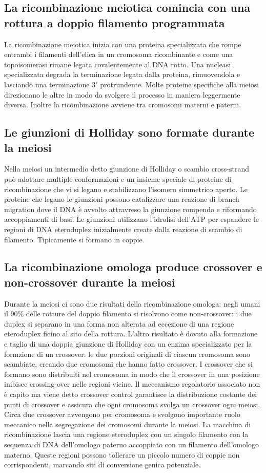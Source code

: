 \subsection{La ricombinazione meiotica comincia con una rottura a doppio filamento programmata}
La ricombinazione meiotica inizia con una proteina specializzata che rompe entrambi i filamenti dell'elica in un cromosoma ricombinante e come una topoisomerasi rimane legata 
covalentemente al DNA rotto. Una nucleasi specializzata degrada la terminazione legata dalla proteina, rimuovendola e lasciando una terminazione $3'$ protrundente. Molte proteine 
specifiche alla meiosi direzionano le altre in modo da svolgere il processo in maniera leggermente diversa. Inoltre la ricombinazione avviene tra cromosomi materni e paterni.
\subsection{Le giunzioni di Holliday sono formate durante la meiosi}
Nella meiosi un intermedio detto giunzione di Holliday o scambio cross-strand pu\`o adottare multiple conformazioni e un insieme speciale di proteine di ricombinazione che vi si legano
e stabilizzano l'isomero simmetrico aperto. Le proteine che legano le giunzioni possono catalizzare una reazione di branch migration dove il DNA \`e avvolto attravreso la giunzione 
rompendo e riformando accoppiamenti di basi. Le giunzioni utilizzano l'idrolisi dell'ATP per espandere le regioni di DNA eteroduplex inizialmente create dalla reazione di scambio di 
filamento. Tipicamente si formano in coppie.
\subsection{La ricombinazione omologa produce crossover e non-crossover durante la meiosi}
Durante la meiosi ci sono due risultati della ricombinazione omologa: negli umani il $90\%$ delle rotture del doppio filamento si risolvono come non-crossover: i due duplex si separano
in una forma non alterata ad eccezione di una regione eteroduplex ficino al sito della rottura. L'altro risultato \`e dovuto alla formazione e taglio di una doppia giunzione di Holliday 
con un enzima specializzato per la formzione di un crossover: le due porzioni originali di ciascun cromosoma sono scambiate, creando due cromosomi che hanno fatto crossover. I 
crossover che si formano sono distribuiti nel cromosoma in modo che il crossover in una posizione inibisce crossing-over nelle regioni vicine. Il meccanismo regolatorio associato non
\`e capito ma viene detto crossover control garantisce la distribuzione costante dei punti di crossover e assicura che ogni cromosoma svolga un crossover ogni meiosi. Circa due 
crossover avvengono per cromosoma e svolgono importante ruolo meccanico nella segregazione dei cromosomi durante la meiosi. La macchina di ricombinazione lascia una regione eteroduplex
con un singolo filamento con la sequenza di DNA dell'omologo paterno accoppiato con un filamento dell'omologo materno. Queste regioni possono tollerare un piccolo numero di coppie non
corrispondenti, marcando siti di conversione genica potenziale. 
